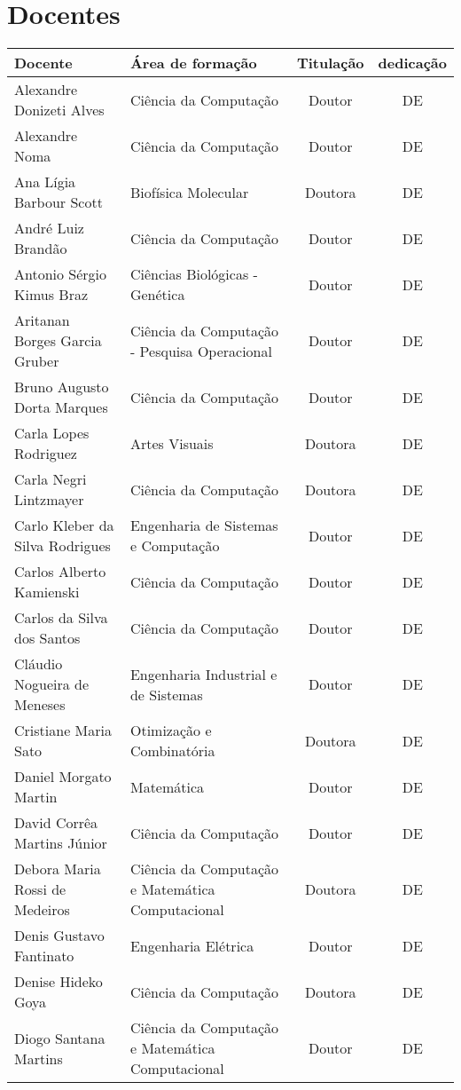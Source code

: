 \section {Docentes}

\begin{longtable}{|l|l|c|c|}
	\hline
	Docente & Área de formação & Titulação & dedicação\\
	\hline\hline
	Alexandre Donizeti Alves & Ciência da Computação & Doutor & DE \\
	Alexandre Noma & Ciência da Computação & Doutor & DE \\
	Ana Lígia Barbour Scott & Biofísica Molecular & Doutora & DE \\
	André Luiz Brandão & Ciência da Computação & Doutor & DE \\
	Antonio Sérgio Kimus Braz & Ciências Biológicas - Genética & Doutor & DE \\
	Aritanan Borges Garcia Gruber & Ciência da Computação - Pesquisa Operacional & Doutor & DE \\
	Bruno Augusto Dorta Marques & Ciência da Computação & Doutor & DE \\
	Carla Lopes Rodriguez & Artes Visuais & Doutora & DE \\
	Carla Negri Lintzmayer & Ciência da Computação & Doutora & DE \\
	Carlo Kleber da Silva Rodrigues & Engenharia de Sistemas e Computação & Doutor & DE \\
	Carlos Alberto Kamienski & Ciência da Computação & Doutor & DE \\
	Carlos da Silva dos Santos & Ciência da Computação & Doutor & DE \\
	Cláudio Nogueira de Meneses & Engenharia Industrial e de Sistemas & Doutor & DE \\
	Cristiane Maria Sato & Otimização e Combinatória & Doutora & DE \\
	Daniel Morgato Martin & Matemática & Doutor & DE \\
	David Corrêa Martins Júnior & Ciência da Computação & Doutor & DE \\
	Debora Maria Rossi de Medeiros & Ciência da Computação e Matemática Computacional & Doutora & DE \\
	Denis Gustavo Fantinato & Engenharia Elétrica & Doutor & DE \\
	Denise Hideko Goya & Ciência da Computação & Doutora & DE \\
	Diogo Santana Martins & Ciência da Computação e Matemática Computacional & Doutor & DE \\

\end{longtable}
